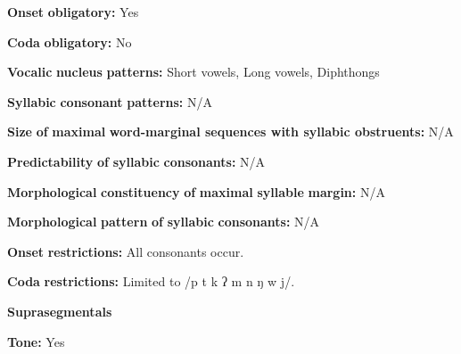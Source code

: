 \documentclass[output=paper]{langsci/langscibook}
\begin{document}
\begin{styleBody}
\textbf{Onset} \textbf{obligatory:} Yes
\end{styleBody}

\begin{styleBody}
\textbf{Coda} \textbf{obligatory:} No
\end{styleBody}

\begin{styleBody}
\textbf{Vocalic} \textbf{nucleus} \textbf{patterns:} Short vowels, Long vowels, Diphthongs
\end{styleBody}

\begin{styleBody}
\textbf{Syllabic} \textbf{consonant} \textbf{patterns:} N/A
\end{styleBody}

\begin{styleBody}
\textbf{Size} \textbf{of} \textbf{maximal} \textbf{word{}-marginal sequences with syllabic obstruents:} N/A
\end{styleBody}

\begin{styleBody}
\textbf{Predictability} \textbf{of} \textbf{syllabic} \textbf{consonants:} N/A
\end{styleBody}

\begin{styleBody}
\textbf{Morphological} \textbf{constituency} \textbf{of} \textbf{maximal} \textbf{syllable} \textbf{margin:} N/A
\end{styleBody}

\begin{styleBody}
\textbf{Morphological} \textbf{pattern} \textbf{of} \textbf{syllabic} \textbf{consonants:} N/A
\end{styleBody}

\begin{styleBody}
\textbf{Onset} \textbf{restrictions:} All consonants occur. 
\end{styleBody}

\begin{styleBody}
\textbf{Coda} \textbf{restrictions:} Limited to /p t k ʔ m n ŋ w j/.
\end{styleBody}

\begin{styleBody}
\textbf{Suprasegmentals}
\end{styleBody}

\begin{styleBody}
\textbf{Tone:} Yes
\end{styleBody}
\end{document}
